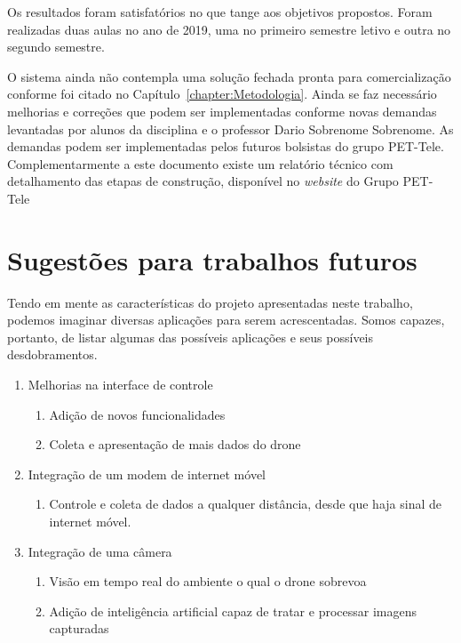 \documentclass[12pt,a4paper,oneside]{book}
\begin{document}
Os resultados foram satisfatórios no que tange aos objetivos propostos. 
Foram realizadas duas aulas no ano de 2019, uma no primeiro semestre letivo e outra no segundo semestre.

O sistema ainda não contempla uma solução fechada pronta para comercialização conforme foi citado no Capítulo~\ref{chapter:Metodologia}.
%
Ainda se faz necessário melhorias e correções que podem ser implementadas conforme novas demandas levantadas por alunos da disciplina e o professor Dario Sobrenome Sobrenome.
%
As demandas podem ser implementadas pelos futuros bolsistas do grupo PET-Tele. Complementarmente a este documento existe um relatório técnico com detalhamento das etapas de construção, disponível no \textit{website} do Grupo PET-Tele~\cite{url:projeto_ladisan}


\chapter{Sugestões para trabalhos futuros}
%
\thispagestyle{empty} 
%
%
Tendo em mente as características do projeto apresentadas neste trabalho, podemos imaginar diversas aplicações para serem acrescentadas. Somos capazes, portanto, de listar algumas das possíveis aplicações e seus possíveis desdobramentos.
%
\begin{enumerate}
    \item Melhorias na interface de controle 
        \begin{enumerate}
            \item Adição de novos funcionalidades
            \item Coleta e apresentação de mais dados do drone  
        \end{enumerate}
    \item Integração de um modem de internet móvel
        \begin{enumerate}
            \item Controle e coleta de dados a qualquer distância, desde que haja sinal de internet móvel.
        \end{enumerate}
    \item Integração de uma câmera
        \begin{enumerate}
            \item Visão em tempo real do ambiente o qual o drone sobrevoa
            \item Adição de inteligência artificial capaz de tratar e processar imagens capturadas
        \end{enumerate}
\end{enumerate}
\end{document}
